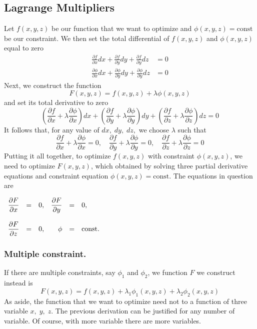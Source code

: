 \documentclass[../../Main.tex]{subfiles}
\begin{document}
\subsection*{Lagrange Multipliers}
Let $f(x,y,z)$ be our function that we want to optimize and $\phi(x,y,z)=\text{const}$ be our constraint. We then set the total differential of $f(x,y,z)$ and $\phi(x,y,z)$ equal to zero
\begin{align*}
    \frac{\partial f}{\partial x}dx + \frac{\partial f}{\partial y}dy + \frac{\partial f}{\partial y}dz&=0\\
    \frac{\partial \phi}{\partial x}dx + \frac{\partial \phi}{\partial y}dy + \frac{\partial \phi}{\partial y}dz&=0
\end{align*}
Next, we construct the function
\begin{equation*}
    F(x,y,z)=f(x,y,z)+\lambda\phi(x,y,z)
\end{equation*}
and set its total derivative to zero
\begin{equation*}
    \left(\frac{\partial f}{\partial x}+ \lambda\frac{\partial \phi}{\partial x}\right)dx + \left(\frac{\partial f}{\partial y}+ \lambda\frac{\partial \phi}{\partial y}\right)dy + \left(\frac{\partial f}{\partial z}+ \lambda\frac{\partial \phi}{\partial z}\right)dz = 0
\end{equation*}
It follows that, for any value of $dx,\;dy,\;dz,$ we choose $\lambda$ such that 
\begin{equation*}
    \frac{\partial f}{\partial x}+ \lambda\frac{\partial \phi}{\partial x}=0,\quad \frac{\partial f}{\partial y}+ \lambda\frac{\partial \phi}{\partial y}=0,\quad \frac{\partial f}{\partial z}+ \lambda\frac{\partial \phi}{\partial z}=0
\end{equation*}
Putting it all together, to optimize $f(x,y,z)$ with constraint $\phi(x,y,z)$, we need to optimize $F(x,y,z)$, which obtained by solving three partial derivative equations and constraint equation $\phi(x,y,z)=\text{const}$. The equations in question are
\begin{center}
    $\begin{array}{r c l r c l}
        \displaystyle\frac{\partial F}{\partial x}&=&0,&\displaystyle\frac{\partial F}{\partial y}&=&0,\\
        \\
        \displaystyle\frac{\partial F}{\partial z}&=&0,&\phi&=&\text{const.}
    \end{array}$
\end{center}

\subsubsection*{Multiple constraint.} If there are multiple constraints, say $\phi_1$ and $\phi_2$, we function $F$ we construct instead is 
\begin{equation*}
    F(x,y,z)=f(x,y,z)+\lambda_1\phi_1(x,y,z)+\lambda_2\phi_2(x,y,z)
\end{equation*}
As aside, the function that we want to optimize need not to a function of three variable $x,\;y,\;z$. The previous derivation can be justified for any number of variable. Of course, with more variable there are more variables.
\end{document}
